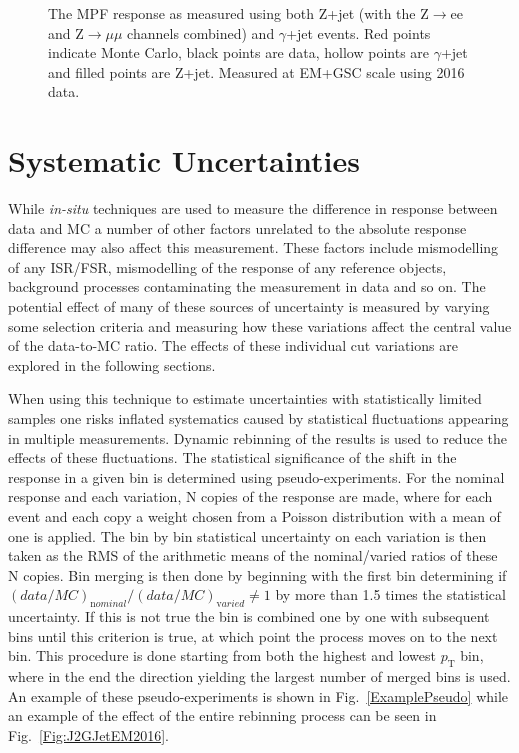 \begin{figure}[!ht]
  \begin{center}
  \end{center}
  \caption[Comparing EM scale response between Z+jet and $\gamma$+jet]
  {\small The MPF response as measured using both Z+jet (with the Z$\rightarrow$ee and Z$\rightarrow\mu\mu$ channels combined) and $\gamma$+jet events.  Red points indicate Monte Carlo, black points are data, hollow points are $\gamma$+jet and filled points are Z+jet.  Measured at EM+GSC scale using 2016 data.   }
  \label{GammaZCompare2016EM}
\end{figure}


\section{Systematic Uncertainties}

While \textit {in-situ} techniques are used to measure the difference in response between data and MC a number of other factors unrelated to the absolute response difference may also affect this measurement.  
These factors include mismodelling of any ISR/FSR, mismodelling of the response of any reference objects, background processes contaminating the measurement in data and so on.  
The potential effect of many of these sources of uncertainty is measured by varying some selection criteria and measuring how these variations affect the central value of the data-to-MC ratio.  
The effects of these individual cut variations are explored in the following sections.  

When using this technique to estimate uncertainties with statistically limited samples one risks inflated systematics caused by statistical fluctuations appearing in multiple measurements.  
Dynamic rebinning of the results is used to reduce the effects of these fluctuations.  
The statistical significance of the shift in the response in a given bin is determined using pseudo-experiments.  
For the nominal response and each variation, N copies of the response are made, where for each event and each copy a weight chosen from a Poisson distribution with a mean of one is applied.  
The bin by bin statistical uncertainty on each variation is then taken as the RMS of the arithmetic means of the nominal/varied ratios of these N copies.  
Bin merging is then done by beginning with the first bin determining if $\left(data/MC\right)_{\mathrm nominal}/\left(data/MC\right)_{\mathrm varied}\neq1$ by more than 1.5 times the statistical uncertainty.  
If this is not true the bin is combined one by one with subsequent bins until this criterion is true, at which point the process moves on to the next bin.  
This procedure is done starting from both the highest and lowest $p_{\mathrm T}$ bin, where in the end the direction yielding the largest number of merged bins is used.  
An example of these pseudo-experiments is shown in Fig.~\ref{ExamplePseudo} while an example of the effect of the entire rebinning process can be seen in Fig.~\ref{Fig:J2GJetEM2016}.  

